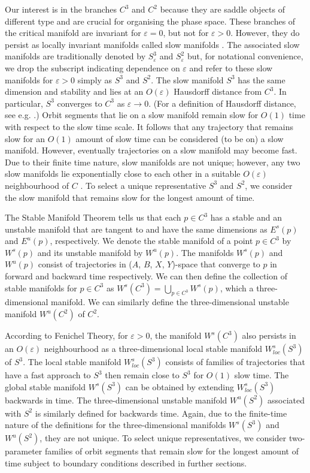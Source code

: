 \documentclass{ws-ijbc}
\begin{document}
Our interest is in the branches $C^3$ and $C^2$ because they are saddle objects of different type and are crucial for organising the phase space.  These branches of the critical manifold are invariant for $\varepsilon = 0$, but not for $\varepsilon > 0$.  However, they do persist as locally invariant manifolds called slow manifolds \cite{Fenichel}.  The associated slow manifolds are traditionally denoted by $S^3_\varepsilon$ and $S^2_\varepsilon$ but, for notational convenience, we drop the subscript indicating dependence on $\varepsilon$ and refer to these slow manifolds for $\varepsilon > 0$ simply as $S^3$ and $S^2$.  The slow manifold $S^3$ has the same dimension and stability and lies at an $O(\varepsilon)$ Hausdorff distance from $C^3$.  In particular, $S^3$ converges to $C^3$ as $\varepsilon \rightarrow 0$.  (For a definition of Hausdorff distance, see e.g. \cite{Hausdorff_Distance}.)  Orbit segments that lie on a slow manifold remain slow for $O(1)$ time with respect to the slow time scale.  It follows that any trajectory that remains slow for an $O(1)$ amount of slow time can be considered (to be on) a slow manifold.  However, eventually trajectories on a slow manifold may become fast. Due to their finite time nature, slow manifolds are not unique; however, any two slow manifolds lie exponentially close to each other in a suitable $O(\varepsilon)$ neighbourhood of $C$ \cite{Fenichel}.  To select a unique representative $S^3$ and $S^2$, we consider the slow manifold that remains slow for the longest amount of time.

The Stable Manifold Theorem tells us that each $p \in C^3$ has a stable and an unstable manifold that are tangent to and have the same dimensions as $E^{s}(p)$ and $E^{u}(p)$, respectively.  We denote the stable manifold of a point $p \in C^3$ by $W^{s}(p)$ and its unstable manifold by $W^{u}(p)$.  The manifolds $W^{s}(p)$ and $W^{u}(p)$ consist of trajectories in ($A$, $B$, $X$, $Y$)-space that converge to $p$ in forward and backward time respectively.  We can then define the collection of stable manifolds for $p \in C^3$ as $W^{s}(C^3) = \bigcup_{p \in C^3} W^{s}(p)$, which a three-dimensional manifold.  We can similarly define the three-dimensional unstable manifold $W^{u}(C^2)$ of $C^2$.

According to Fenichel Theory, for $\varepsilon > 0$, the manifold $W^{s}(C^3)$ also persists in an $O(\varepsilon)$ neighbourhood as a three-dimensional local stable manifold $W^{s}_{loc}(S^3)$ of $S^3$.  The local stable manifold $W^{s}_{loc}(S^3)$ consists of families of trajectories that have a fast approach to $S^3$ then remain close to $S^3$ for $O(1)$ slow time.  The global stable manifold $W^{s}(S^3)$ can be obtained by extending $W^{s}_{loc}(S^3)$ backwards in time.  The three-dimensional unstable manifold $W^{u}(S^2)$ associated with $S^2$ is similarly defined for backwards time.  Again, due to the finite-time nature of the definitions for the three-dimensional manifolds $W^{s}(S^3)$ and $W^{u}(S^2)$, they are not unique.  To select unique representatives, we consider two-parameter families of orbit segments that remain slow for the longest amount of time subject to boundary conditions described in further sections.  
 
\end{document}
